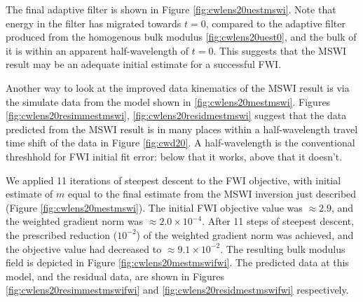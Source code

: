 
The final adaptive filter is shown in Figure
\ref{fig:cwlens20uestmswi}. Note that energy in the filter has
migrated towards $t=0$, compared to the adaptive filter produced from
the homogenous bulk modulus \ref{fig:cwlens20uest0}, and the bulk of
it is within an apparent half-wavelength of $t=0$. This suggests that
the MSWI result may be an adequate initial estimate for a successful
FWI.


Another way to look at the improved data kinematics of the MSWI result
is via the simulate data from the model shown in
\ref{fig:cwlens20mestmswi}. Figures \ref{fig:cwlens20resimmestmswi},
\ref{fig:cwlens20residmestmswi} suggest that the
data predicted from the MSWI result is in many places within a
half-wavelength travel time shift of the data in Figure \ref{fig:cwd20}.
A half-wavelength is the conventional threshhold for FWI initial fit
error: below that it works, above that it doesn't.


We applied 11 iterations of steepest descent to the FWI objective,
with initial estimate of $m$ equal to the final estimate from the MSWI
inversion just described (Figure \ref{fig:cwlens20mestmswi}). The initial FWI
objective value was $\approx 2.9$, and the weighted gradient norm was
$\approx 2.0 \times 10^{-4}$.  After 11 steps of steepest descent,
the prescribed reduction ($10^{-2}$) of the weighted gradient norm was achieved,
and the objective value had decreased to $\approx 9.1 \times
10^{-2}$. The resulting bulk modulus field is depicted in Figure
\ref{fig:cwlens20mestmswifwi}. The predicted data at this model, and the residual
data, are shown in Figures \ref{fig:cwlens20resimmestmswifwi} and \ref{fig:cwlens20residmestmswifwi}
respectively.


